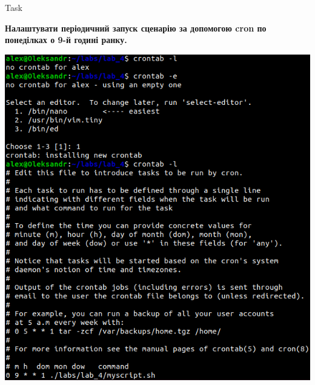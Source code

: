 \documentclass[a4paper,12pt]{article}
\newcommand{\RomanNumeralCaps}[1]{\MakeUppercase{\romannumeral #1}}
\begin{document}
\newpage
    \begin{center}
        \Large{Task \RomanNumeralCaps{2}}
    \end{center}
    \textbf{Налаштувати періодичний запуск сценарію за допомогою cron по понеділках о 9-й годині ранку.} \\
    \begin{minipage}[h]{1\linewidth}
        \centering
        \includegraphics[width=0.9\linewidth]{Prt sc/Figure_4.png}  
    \end{minipage}
\end{document}
